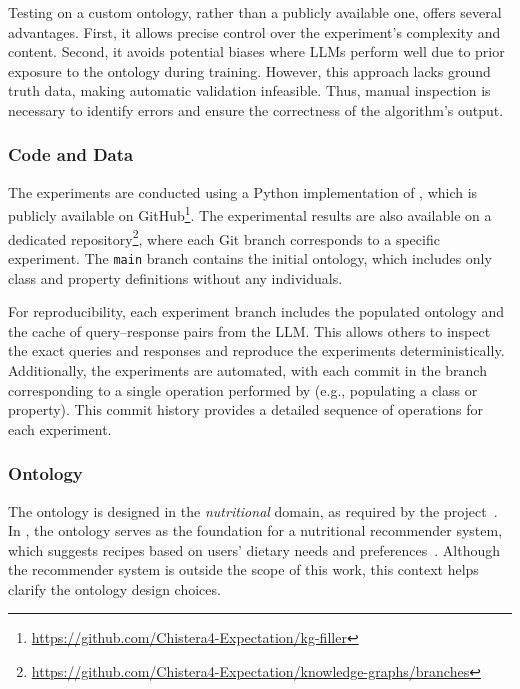 %
Testing \llmfkg{} on a custom ontology, rather than a publicly available one, offers several advantages.
%
First, it allows precise control over the experiment's complexity and content.
%
Second, it avoids potential biases where \glspl{LLM} perform well due to prior exposure to the ontology during training.
%
However, this approach lacks ground truth data, making automatic validation infeasible.
%
Thus, manual inspection is necessary to identify errors and ensure the correctness of the algorithm's output.

%
\subsubsection{Code and Data}
\label{subsubsec:code-and-data}
%
The experiments are conducted using a Python implementation of \llmfkg{}, which is publicly available on GitHub\footnote{\url{https://github.com/Chistera4-Expectation/kg-filler}}.
%
The experimental results are also available on a dedicated repository\footnote{\url{https://github.com/Chistera4-Expectation/knowledge-graphs/branches}}, where each Git branch corresponds to a specific experiment.
%
The \texttt{main} branch contains the initial ontology, which includes only class and property definitions without any individuals.

%
For reproducibility, each experiment branch includes the populated ontology and the cache of query--response pairs from the \gls{LLM}.
%
This allows others to inspect the exact queries and responses and reproduce the experiments deterministically.
%
Additionally, the experiments are automated, with each commit in the branch corresponding to a single operation performed by \llmfkg{} (e.g., populating a class or property).
%
This commit history provides a detailed sequence of operations for each experiment.

%
\subsubsection{Ontology}
\label{subsubsec:kgfiller-ontology}
%
The ontology is designed in the \emph{nutritional} domain, as required by the \expectation{} project~\cite{expectation-extraamas2021}.
%
In \expectation{}, the ontology serves as the foundation for a nutritional recommender system, which suggests recipes based on users' dietary needs and preferences~\cite{skerecommender-cmbp235}.
%
Although the recommender system is outside the scope of this work, this context helps clarify the ontology design choices.

